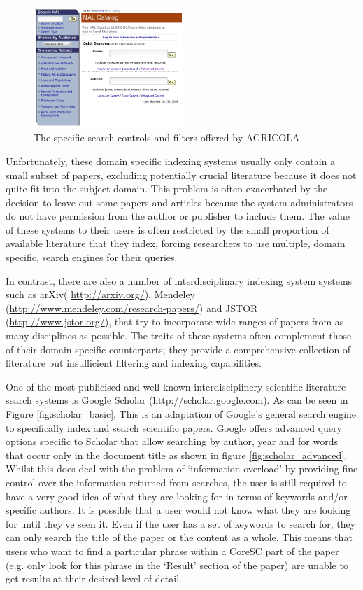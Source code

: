 \begin{figure}[!h]
\centering
\includegraphics[width=0.5\textwidth]{images/litreview/agricola.png}
\caption{The specific search controls and filters offered by AGRICOLA}
\label{fig:agricola}
\end{figure}

Unfortunately, these domain specific indexing systems usually only contain a
small subset of papers, excluding potentially crucial literature because it
does not quite fit into the subject domain. This problem is often exacerbated
by the decision to leave out some papers and articles because the system
administrators do not have permission from the author or publisher to include
them. The value of these systems to their users is often restricted by the
small proportion of available literature that they index, forcing researchers
to use multiple, domain specific, search engines for their queries.

In contrast, there are also a number of interdisciplinary indexing system
systems such as arXiv( \url{http://arxiv.org/}), Mendeley
(\url{http://www.mendeley.com/research-papers/}) and JSTOR
(\url{http://www.jstor.org/}), that try to incorporate wide ranges of papers
from as many disciplines as possible. The traits of these systems often
complement those of their domain-specific counterparts; they provide a
comprehensive collection of literature but insufficient filtering and indexing
capabilities.

One of the most publicised and well known interdisciplinery scientific
literature search systems is Google Scholar (\url{http://scholar.google.com}).
As can be seen in Figure \ref{fig:scholar_basic}, This is an adaptation of
Google's general search engine to specifically index and search scientific
papers.  Google offers advanced query options specific to Scholar that allow
searching by author, year and for words that occur only in the document title
as shown in figure \ref{fig:scholar_advanced}. Whilst this does deal with the
problem of `information overload' by providing fine control over the
information returned from searches,  the user is still required to have a very
good idea of what they are looking for in terms of keywords and/or specific
authors. It is possible that a user would not know what they are looking for
until they've seen it. Even if the user has a set of keywords to search for,
they can only search the title of the paper or the content as a whole. This
means that users who want to find a particular phrase within a CoreSC part of
the paper (e.g.  only look for this phrase in the `Result' section of the
paper) are unable to get results at their desired level of detail.

